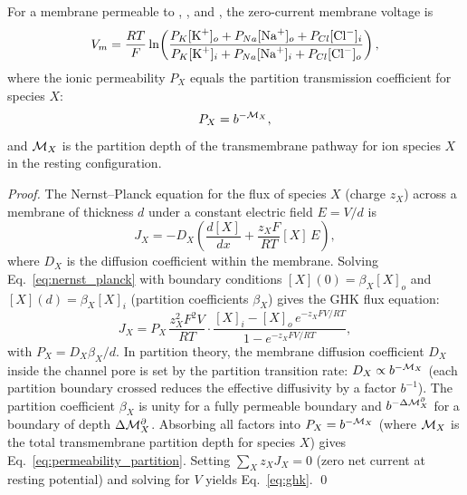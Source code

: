 \begin{theorem}
\label{thm:ghk}
For a membrane permeable to , , and , the zero-current
membrane voltage is
\begin{equation}
  V_m = \frac{RT}{F}\ln\!\left(
    \frac{P_K[\ce{K+}]_o + P_{Na}[\ce{Na+}]_o + P_{Cl}[\ce{Cl-}]_i}
         {P_K[\ce{K+}]_i + P_{Na}[\ce{Na+}]_i + P_{Cl}[\ce{Cl-}]_o}
  \right),
  \label{eq:ghk}
\end{equation}
where the ionic permeability $P_X$ equals the partition transmission
coefficient for species $X$:
\begin{equation}
  P_X = b^{-\mathcal{M}_X},
  \label{eq:permeability_partition}
\end{equation}
and $\mathcal{M}_X$ is the partition depth of the transmembrane pathway for ion
species $X$ in the resting configuration.
\end{theorem}

\begin{proof}
The Nernst--Planck equation for the flux of species $X$ (charge $z_X$) across
a membrane of thickness $d$ under a constant electric field $E = V/d$ is
\begin{equation}
  J_X = -D_X\!\left(\frac{d[X]}{dx} + \frac{z_X F}{RT}[X]\,E\right),
  \label{eq:nernst_planck}
\end{equation}
where $D_X$ is the diffusion coefficient within the membrane. Solving
Eq.~\eqref{eq:nernst_planck} with boundary conditions $[X](0) = \beta_X[X]_o$
and $[X](d) = \beta_X[X]_i$ (partition coefficients $\beta_X$) gives the
GHK flux equation:
\begin{equation}
  J_X = P_X\,\frac{z_X^2 F^2 V}{RT}
    \cdot\frac{[X]_i - [X]_o\,e^{-z_X FV/RT}}{1 - e^{-z_X FV/RT}},
  \label{eq:ghk_flux}
\end{equation}
with $P_X = D_X \beta_X / d$. In partition theory, the membrane diffusion
coefficient $D_X$ inside the channel pore is set by the partition transition
rate: $D_X \propto b^{-\mathcal{M}_X}$ (each partition boundary crossed reduces
the effective diffusivity by a factor $b^{-1}$). The partition coefficient
$\beta_X$ is unity for a fully permeable boundary and $b^{-\Delta\mathcal{M}_X^{\partial}}$
for a boundary of depth $\Delta\mathcal{M}_X^{\partial}$. Absorbing all factors
into $P_X = b^{-\mathcal{M}_X}$ (where $\mathcal{M}_X$ is the total transmembrane
partition depth for species $X$) gives Eq.~\eqref{eq:permeability_partition}.
Setting $\sum_X z_X J_X = 0$ (zero net current at resting potential) and
solving for $V$ yields Eq.~\eqref{eq:ghk}. \qed
\end{proof}

